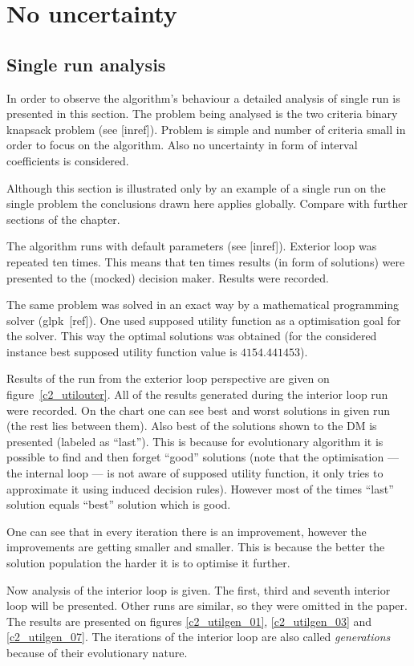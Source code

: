 \section{No uncertainty}
\subsection{Single run analysis}
In order to observe the algorithm's behaviour a detailed analysis of single
run is presented in this section. The problem being analysed is the two
criteria binary knapsack problem (see [inref]). Problem is simple and number
of criteria small in order to focus on the algorithm. Also no uncertainty in
form of interval coefficients is considered.

Although this section is illustrated only by an example of a single run on the
single problem the conclusions drawn here applies globally. Compare with
further sections of the chapter.

The algorithm runs with default parameters (see [inref]). Exterior loop was
repeated ten times. This means that ten times results (in form of solutions)
were presented to the (mocked) decision maker. Results were recorded.

The same problem was solved in an exact way by a mathematical programming
solver (glpk~[ref]). One used supposed utility function as a optimisation goal
for the solver. This way the optimal solutions was obtained (for the
considered instance best supposed utility function value is $4154.441453$).

Results of the run from the exterior loop perspective are given on
figure~\ref{c2_utilouter}. All of the results generated during the interior
loop run were recorded. On the chart one can see best and worst solutions in
given run (the rest lies between them). Also best of the solutions shown to
the DM is presented (labeled as ``last''). This is because for evolutionary
algorithm it is possible to find and then forget ``good'' solutions (note that
the optimisation --- the internal loop --- is not aware of supposed utility
function, it only tries to approximate it using induced decision
rules). However most of the times ``last'' solution equals ``best'' solution
which is good.

One can see that in every iteration there is an improvement, however the
improvements are getting smaller and smaller. This is because the better the
solution population the harder it is to optimise it further.

Now analysis of the interior loop is given. The first, third and seventh
interior loop will be presented. Other runs are similar, so they were omitted
in the paper. The results are presented on figures \ref{c2_utilgen_01},
\ref{c2_utilgen_03} and \ref{c2_utilgen_07}. The iterations of the interior
loop are also called \textit{generations} because of their evolutionary
nature.


